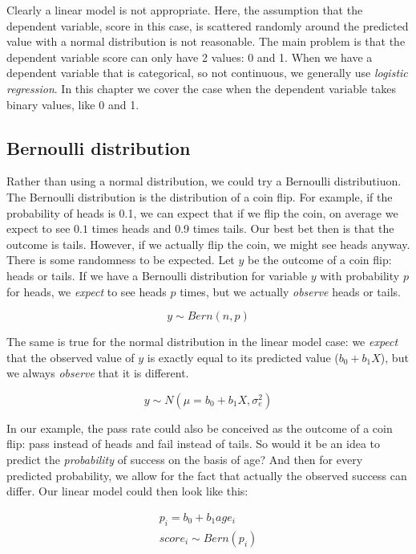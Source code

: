 \documentclass[]{report}\usepackage[]{graphicx}\usepackage[]{color}
\begin{document}
Clearly a linear model is not appropriate. Here, the assumption that the dependent variable, score in this case, is scattered randomly around the predicted value with a normal distribution is not reasonable. The main problem is that the dependent variable score can only have 2 values: 0 and 1. When we have a dependent variable that is categorical, so not continuous, we generally use \textit{logistic regression}. In this chapter we cover the case when the dependent variable takes binary values, like 0 and 1.


\subsection{Bernoulli distribution}

Rather than using a normal distribution, we could try a Bernoulli distributiuon. The Bernoulli distribution is the distribution of a coin flip. For example, if the probability of heads is 0.1, we can expect that if we flip the coin, on average we expect to see $0.1$ times heads and 0.9 times tails. Our best bet then is that the outcome is tails. However, if we actually flip the coin, we might see heads anyway. There is some randomness to be expected. Let $y$ be the outcome of a coin flip: heads or tails. If we have a Bernoulli distribution for variable $y$ with probability $p$ for heads, we \textit{expect} to see heads $p$ times, but we actually \textit{observe} heads or tails.

\begin{equation}
y \sim Bern(n, p)
\end{equation}

The same is true for the normal distribution in the linear model case: we \textit{expect} that the observed value of $y$ is exactly equal to its predicted value ($b_0 + b_1 X$), but we always \textit{observe} that it is different.

\begin{equation}
y \sim N(\mu= b_0 + b_1 X, \sigma^2_e)
\end{equation}

In our example, the pass rate could also be conceived as the outcome of a coin flip: pass instead of heads and fail instead of tails. So would it be an idea to predict the \textit{probability} of success on the basis of age? And then for every predicted probability, we allow for the fact that actually the observed success can differ. Our linear model could then look like this:


\begin{eqnarray}
p_i = b_0 + b_1 age_i \\
score_i \sim Bern(p_i)
\end{eqnarray}
\end{document}
